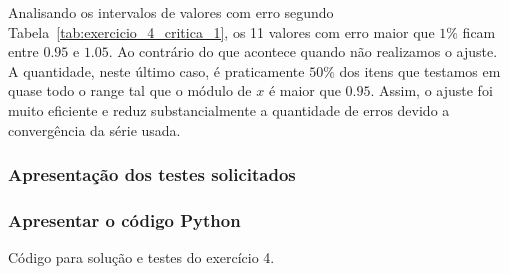 Analisando os intervalos de valores com erro segundo Tabela~\ref{tab:exercicio_4_critica_1}, os 11 valores com erro maior que $1 \%$ ficam entre $0.95$ e $1.05$.
Ao contrário do que acontece quando não realizamos o ajuste. A quantidade, neste último caso, é praticamente $50 \%$ dos itens que testamos em quase todo o range tal que o módulo de $x$ é maior que $0.95$.
Assim, o ajuste foi muito eficiente e reduz substancialmente a quantidade de erros devido a convergência da série usada.

\subsubsection{Apresentação dos testes solicitados}
    

\subsubsection{Apresentar o código Python}
    
    Código para solução e testes do exercício 4.
